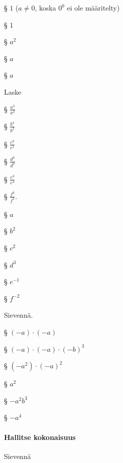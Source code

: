 \begin{tehtavasivu}
\begin{tehtava}
\begin{vastaus}
§ $1$  ($a\neq0$, koska $0^0$ ei ole määritelty)
           
§ $1$
           
§ $a^2$
           
§ $a$
           
§ $a$
        \end{vastaus}
    \end{tehtava}

    \begin{tehtava}
        Laske
       
§ $\frac{a^3}{a^2}$
       
§ $\frac{b^4}{b^2}$
       
§ $\frac{c^3}{c^1}$
       
§ $\frac{d^3}{d^0}$
       
§ $\frac{e^3}{e^4}$
       
§ $\frac{f^3}{f^5}$.
        
        \begin{vastaus}
           
§ $a$
           
§ $b^2$
           
§ $c^2$
           
§ $d^3$
           
§ $e^{-1}$
           
§ $f^{-2}$
        \end{vastaus}
    \end{tehtava}
    
        \begin{tehtava}
     Sievennä.
       
§ $(-a)\cdot(-a)$ 
       
§ $(-a)\cdot(-a)\cdot(-b)^3$ 
       
§ $(-a^2)\cdot(-a)^2$

        \begin{vastaus}
           
§ $a^2$ 
           
§ $-a^2b^3$ 
           
§ $-a^4$
        \end{vastaus}
    \end{tehtava}
    
\paragraph*{Hallitse kokonaisuus}



\begin{tehtava}
  		Sievennä
        \begin{vastaus}
        \end{vastaus}
\end{tehtava}


\end{tehtavasivu}
